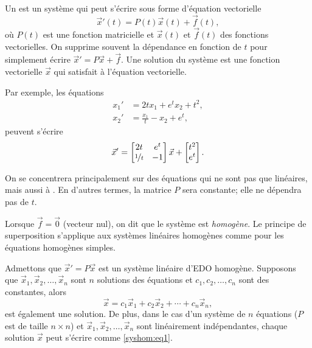Un \emph{} est un système qui peut s’écrire sous forme d’équation vectorielle
\begin{equation*}
{\vec{x}}'(t) = P(t)\vec{x}(t) + \vec{f}(t),
\end{equation*}
où $P(t)$ est une fonction matricielle et $\vec{x}(t)$ et $\vec{f}(t)$ des fonctions vectorielles. On supprime souvent la dépendance en fonction de $t$ pour simplement écrire ${\vec{x}}' = P\vec{x} + \vec{f}$.  Une solution du système est une fonction vectorielle
$\vec{x}$ qui satisfait à l’équation vectorielle.

Par exemple, les équations
\begin{align*}
x_1' &= 2t x_1 + e^t x_2 + t^2 , \\
x_2' &= \frac{x_1}{t} -x_2 + e^t ,
\end{align*}
peuvent s'écrire
\begin{equation*}
{\vec{x}}' = 
\begin{bmatrix}
2t & e^t \\
\nicefrac{1}{t} & -1
\end{bmatrix}
\vec{x}
+
\begin{bmatrix}
t^2 \\
e^t
\end{bmatrix} .
\end{equation*}

On se concentrera principalement sur des équations qui ne sont pas que linéaires, mais aussi à \emph{}.  En d’autres termes, la matrice $P$ sera constante; elle ne dépendra pas de $t$.

\medskip

Lorsque $\vec{f} = \vec{0}$ (vecteur nul), on dit que le système est
\emph{homogène}.
Le principe de superposition s’applique aux systèmes linéaires homogènes comme pour les équations homogènes simples.

\begin{theorem}[Superposition]
Admettons que
${\vec{x}}' = P\vec{x}$ est un système linéaire d’EDO homogène. Supposons que
$\vec{x}_1,\vec{x}_2,\ldots,\vec{x}_n$ sont $n$ solutions des équations et  $c_1,c_2,\ldots,c_n$ sont des constantes, alors
\begin{equation} \label{syshom:eq1}
\vec{x} = c_1 \vec{x}_1 + c_2 \vec{x}_2 + \cdots + c_n \vec{x}_n ,
\end{equation}
est également une solution. De plus, dans le cas d'un système de $n$ équations ($P$ est de taille $n\times n$) et
$\vec{x}_1,\vec{x}_2,\ldots,\vec{x}_n$ sont linéairement indépendantes, chaque solution $\vec{x}$ peut s’écrire comme \eqref{syshom:eq1}.
\end{theorem}

